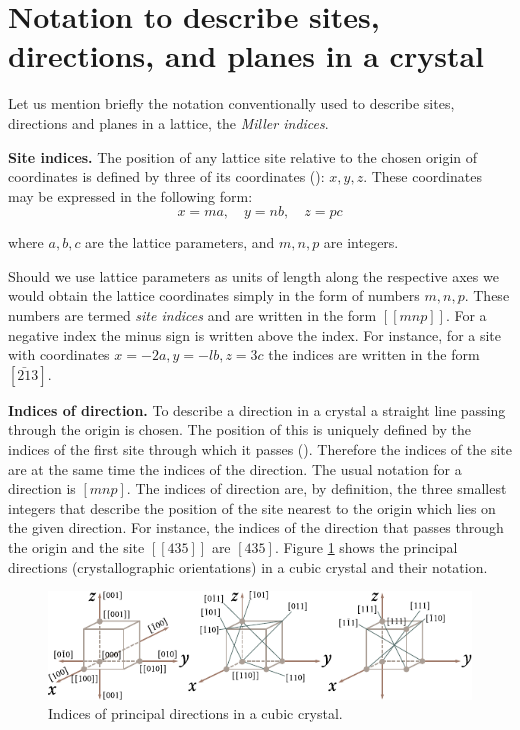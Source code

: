 \section{Notation to describe sites, directions, and planes in a crystal}\label{sec:1_9}

Let us mention briefly the notation conventionally used to describe sites, directions and planes in a lattice, the \textit{Miller indices}.

\textbf{Site indices.} The position of any lattice site relative to the chosen origin of coordinates is defined by three of its coordinates (): $x, y, z$. These coordinates may be expressed in the following form:
\begin{equation*}
	x = ma,\quad y = nb,\quad z = pc
\end{equation*}

\noindent
where $a, b, c$ are the lattice parameters, and $m, n, p$ are integers.

Should we use lattice parameters as units of length along the respective axes we would obtain the lattice coordinates simply in the form of numbers $m, n, p$. These numbers are termed \textit{site indices} and are written in the form $[[mnp]]$. For a negative index the minus sign is written above the index. For instance, for a site with coordinates $x=-2a, y =-lb, z=3c$ the indices are written in the form $[\bar{21}3]$.

\textbf{Indices of direction.} To describe a direction in a crystal a straight line passing through the origin is chosen. The position of this is uniquely defined by the indices of the first site through which it passes (). Therefore the indices of the site are at the same time the indices of the direction. The usual notation for a direction is $[mnp]$. The indices of direction are, by definition, the three smallest integers that describe the position of the site nearest to the origin which lies on the given direction. For instance, the indices of the direction that passes through the origin and the site $[[435]]$ are $[435]$. Figure \ref{fig:1_16} shows the principal directions (crystallographic orientations) in a cubic crystal and their notation.

\begin{figure}[t]
	\begin{center}
		\includegraphics[scale=1.1]{figures/ch_01/fig_1_16.pdf}
		\caption[]{Indices of principal directions in a cubic crystal.}
		\label{fig:1_16}
	\end{center}
	\vspace{-0.7cm}
\end{figure}

